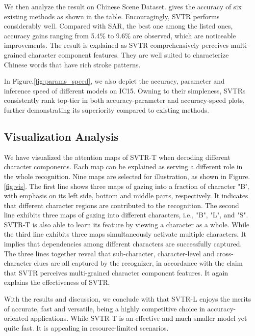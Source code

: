 \documentclass{article}
\begin{document}
We then analyze the result on Chinese Scene Dataset. \cite{chen2021benchmarking} gives the accuracy of six existing methods as shown in the table. Encouragingly, SVTR performs considerably well. Compared with SAR, the best one among the listed ones, accuracy gains ranging from 5.4\% to 9.6\% are observed, which are noticeable improvements. The result is explained as SVTR comprehensively perceives multi-grained character component features. They are well suited to characterize Chinese words that have rich stroke patterns. 

In Figure.\ref{fig:params_speed}, we also depict the accuracy, parameter and inference speed of different models on IC15. Owning to their simpleness, SVTRs consistently rank top-tier in both accuracy-parameter and accuracy-speed plots, further demonstrating its superiority compared to existing methods.  




\subsection{Visualization Analysis}

We have visualized the attention maps of SVTR-T when decoding different character components. Each map can be explained as serving a different role in the whole recognition. Nine maps are selected for illustration, as shown in Figure.\ref{fig:vis}. The first line shows three maps of gazing into a fraction of character "B", with emphasis on its left side, bottom and middle parts, respectively. It indicates that different character regions are contributed to the recognition. The second line exhibits three maps of gazing into different characters, i.e., "B", "L", and "S". SVTR-T is also able to learn its feature by viewing a character as a whole. While the third line exhibits three maps simultaneously activate multiple characters. It implies that dependencies among different characters are successfully captured. The three lines together reveal that sub-character, character-level and cross-character clues are all captured by the recognizer, in accordance with the claim that SVTR perceives multi-grained character component features. It again explains the effectiveness of SVTR.

With the results and discussion, we conclude with that SVTR-L enjoys the merits of accurate, fast and versatile, being a highly competitive choice in accuracy-oriented applications. While SVTR-T is an effective and much smaller model yet quite fast. It is appealing in resource-limited scenarios.
\end{document}
